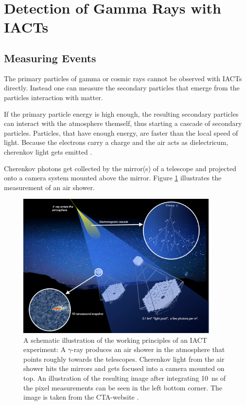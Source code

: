 \section{Detection of Gamma Rays with IACTs}
\subsection{Measuring Events}
\label{sec:measuring}

The primary particles of gamma or cosmic rays cannot be 
observed with IACTs directly. Instead one can measure the secondary particles
that emerge from the particles interaction with matter.

If the primary particle energy is high enough, the resulting 
secondary particles can interact with the atmosphere themself, thus starting a 
cascade of secondary particles.
Particles, that have enough energy, are faster than the local speed of light.
Because the electrons carry a charge and the air acts as dielectricum, 
cherenkov light gets emitted \cite{smth}.

Cherenkov photons get collected by the mirror(s) of a telescope
and projected onto a camera system mounted above the mirror.
Figure \ref{fig:iact_mirror_camera} illustrates the measurement of 
an air shower.

\begin{figure}
	\centering
	\captionsetup{width=0.9\linewidth}
	\includegraphics[width=0.9\textwidth]{images/cta47.png}
	\caption{A schematic illustration of the working principles of 
	an IACT experiment:
	A $\gamma$-ray produces an air shower in the atmosphere
	that points roughly towards the telescopes.
	Cherenkov light from the air shower 
	hits the mirrors and gets focused into a camera mounted on top.
	An illustration of the resulting image after integrating 
	\SI{10}{\nano\second} of the pixel measurements
	can be seen in the left bottom corner.
	The image is taken from the CTA-website \cite{cta_web}.}
	\label{fig:iact_mirror_camera}
\end{figure}

